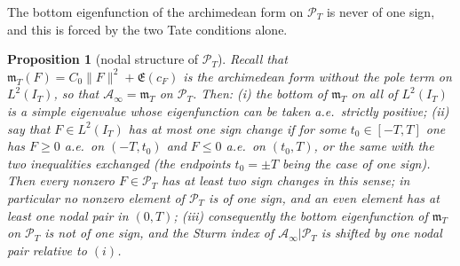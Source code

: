 \documentclass[11pt]{amsart}
\newtheorem{proposition}[theorem]{Proposition}
\theoremstyle{definition}
\theoremstyle{remark}
\newcommand{\PT}{\mathcal P_T}
\newcommand{\IT}{I_T}
\newcommand{\cF}{c_F}
\newcommand{\Lev}{\mathfrak E}
\newcommand{\Ainf}{\mathcal A_\infty}
\newcommand{\mT}{\mathfrak m_T}
\begin{document}
The bottom eigenfunction of the archimedean form on $\PT$ is never of one sign, and this is forced
by the two Tate conditions alone.

\begin{proposition}[nodal structure of $\PT$]\label{prop:nodes}
Recall that $\mT(F)=C_0\|F\|^2+\Lev(\cF)$ is the archimedean form without the pole term on
$L^2(\IT)$, so that $\Ainf=\mT$ on $\PT$. Then:
\emph{(i)} the bottom of $\mT$ on all of $L^2(\IT)$ is a simple eigenvalue whose
eigenfunction can be taken a.e.\ strictly positive;
\emph{(ii)} say that $F\in L^2(\IT)$ has \emph{at most one sign change} if for some
$t_0\in[-T,T]$ one has $F\ge0$ a.e.\ on $(-T,t_0)$ and $F\le0$ a.e.\ on $(t_0,T)$, or the same
with the two inequalities exchanged (the endpoints $t_0=\pm T$ being the case of one sign).
Then every nonzero $F\in\PT$ has at least two sign changes in this sense; in particular no
nonzero element of $\PT$ is of one sign, and an even element has at least one nodal pair in
$(0,T)$;
\emph{(iii)} consequently the bottom eigenfunction of $\mT$ on $\PT$ is not of one sign,
and the Sturm index of $\Ainf|\PT$ is shifted by one nodal pair relative to $(i)$.
\end{proposition}
\end{document}
